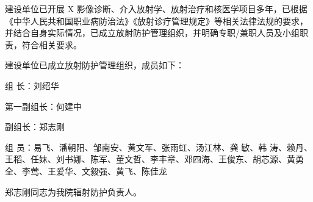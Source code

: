 建设单位已开展 X 影像诊断、介入放射学、放射治疗和核医学项目多年，已根据《中华人民共和国职业病防治法》《放射诊疗管理规定》等相关法律法规的要求，并结合自身实际情况，已成立放射防护管理组织，并明确专职/兼职人员及小组职责，符合相关要求。

建设单位已成立放射防护管理组织，成员如下：

组 长：刘绍华

第一副组长：何建中

副组长：郑志刚

组 员：易飞、潘朝阳、邹南安、黄文军、张雨虹、汤江林、龚 敏、韩 涛、赖丹、王稻、任妹、刘书娜、陈军、董文哲、李丰章、邓四海、王俊东、胡芯源、黄勇全、李莺、王爱华、文毅强、黄飞、陈佳龙

郑志刚同志为我院辐射防护负责人。
